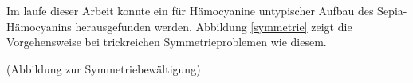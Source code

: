 Im laufe dieser Arbeit konnte ein für Hämocyanine untypischer Aufbau des Sepia-Hämocyanins herausgefunden werden.
Abbildung \ref{symmetrie} zeigt die Vorgehensweise bei trickreichen Symmetrieproblemen wie diesem.

(Abbildung zur Symmetriebewältigung)

